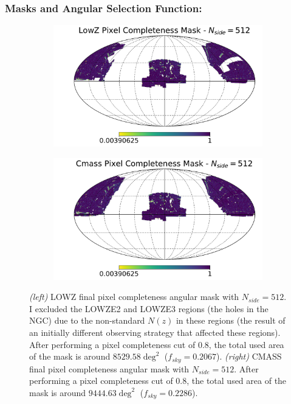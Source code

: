 \subsubsection{Masks and Angular Selection Function:}\label{Sec:Masks}
\begin{figure}
\begin{subfigure}{.5\textwidth}
  \centering
  \includegraphics[width=\linewidth]{BOSS-FIGS/LOWZ_Mask}\label{fig:LOWZ_Mask}
\end{subfigure}%
\begin{subfigure}{.5\textwidth}
  \centering
  \includegraphics[width=\linewidth]{BOSS-FIGS/CMASS_Mask}\label{fig:CMASS_Mask}
\end{subfigure}
\caption[LOWZ and CMASS angular selection function masks.]{{\small \textit{(left)} LOWZ final pixel completeness angular mask with $N_{side}= 512$. I excluded the LOWZE2 and LOWZE3 regions (the holes in the NGC) due to the non-standard $N(z)$ in these regions (the result of an initially different observing strategy that affected these regions). After performing a pixel completeness cut of $0.8$, the total used area of the mask is around $8529.58\deg^2$ ($f_{sky} = 0.2067$). \textit{(right)}  CMASS final pixel completeness angular mask with $N_{side}=512$. After performing a pixel completeness cut of $0.8$, the total used area of the mask is around $9444.63\deg^2$ ($f_{sky} = 0.2286$). }}
\label{fig:Masks}
\end{figure}

